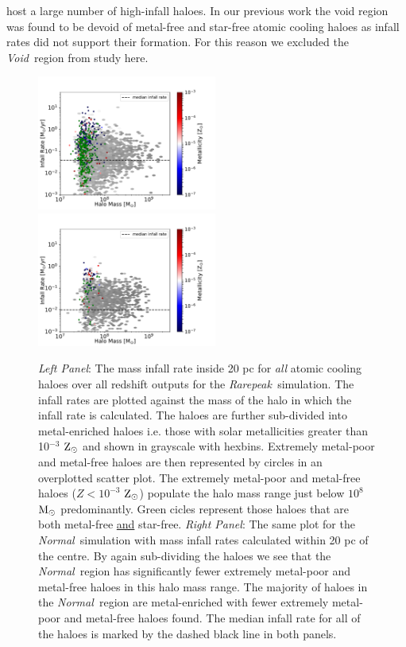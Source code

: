 \documentclass[graphics, twocolumn, usenatbib]{mn2e}
\newcommand{\msolar} {$\rm{M_{\odot}}~$}
\newcommand{\zsolar} {$\rm{Z_{\odot}}~$}
\newcommand{\zsolarc} {$\rm{Z_{\odot}}$}
\newcommand{\rarepeak} {\textit{Rarepeak~}}
\newcommand{\normal} {\textit{Normal~}}
\newcommand{\void} {\textit{Void~}}
\begin{document}
host a large number of high-infall haloes. In our previous work
\citep{Wise_2019, Regan_2019} the void region was found to be devoid of metal-free and
star-free atomic cooling haloes as infall rates
did not support their formation. For this reason we excluded the 
\void region from study here. 
\begin{figure}
\centering
\begin{minipage}{175mm}      \begin{center} 
\centerline{
\includegraphics[width=0.525\textwidth]{FIGURES/Rarepeak_MdotMHaloZ_Hexbin.pdf}
\includegraphics[width=0.525\textwidth]{FIGURES/Normal_MdotMHaloZ_Hexbin.pdf}}
\caption{\textit{Left Panel}: The mass infall rate inside 20 pc for \textit{all} atomic
  cooling haloes over all redshift outputs for the \rarepeak simulation. The infall rates
  are plotted against the mass of the halo in which the infall rate is
  calculated. The haloes are further sub-divided into metal-enriched haloes
  i.e. those with solar metallicities greater than 10$^{-3}$ \zsolar and shown in grayscale with
  hexbins. Extremely metal-poor and metal-free
  haloes are then represented by circles in an overplotted scatter plot. The extremely metal-poor
  and metal-free haloes ($Z < 10^{-3}$ \zsolarc) populate the halo mass range just below $10^{8}$
  \msolar predominantly.
  Green cicles represent those haloes that are both metal-free \underline{and} star-free. 
  \textit{Right Panel}: The same plot for the \normal simulation with mass infall
  rates calculated within 20 pc of the centre. By again sub-dividing the haloes we see
  that the \normal region has significantly fewer extremely metal-poor and metal-free haloes in
  this halo mass range.
  The majority of haloes in the \normal region are metal-enriched with fewer extremely metal-poor and
  metal-free haloes found. The median infall rate for all of the haloes is marked by the dashed
  black line in both panels.}
\label{Fig:HaloMass}
\end{center} \end{minipage}

\end{figure}
\end{document}
